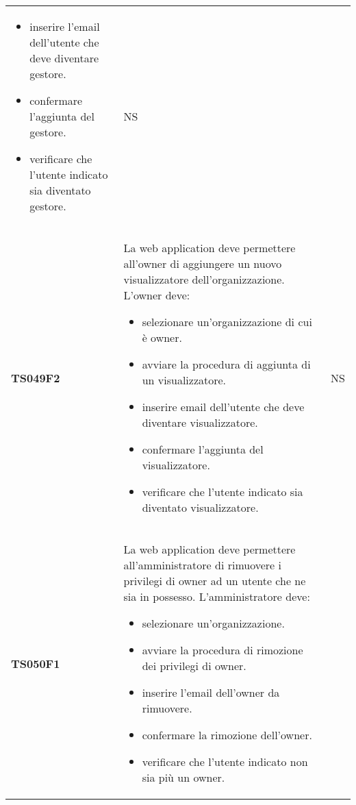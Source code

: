 \documentclass[../piano-di-qualifica.tex]{subfiles}
\begin{document}
\begin{centering}
\begin{longtable}[H]{>{\centering\bfseries}m{3cm} >{}p{10cm} >{\centering\arraybackslash}m{3cm}}
\begin{itemize}
      \item inserire l'email dell'utente che deve diventare gestore.
      \item confermare l'aggiunta del gestore.
      \item verificare che l'utente indicato sia diventato gestore.
    \end{itemize}
                       & NS                                                                                                                                                                                                                                                               \\
    TS049F2            & La web application deve permettere all'owner di aggiungere un nuovo visualizzatore dell'organizzazione. \newline
    L'owner deve:
    \begin{itemize}
      \item selezionare un'organizzazione di cui è owner.
      \item avviare la procedura di aggiunta di un visualizzatore.
      \item inserire email dell'utente che deve diventare visualizzatore.
      \item confermare l'aggiunta del visualizzatore.
      \item verificare che l'utente indicato sia diventato visualizzatore.
    \end{itemize}
                       & NS                                                                                                                                                                                                                                                               \\
    TS050F1            & La web application deve permettere all'amministratore di rimuovere i privilegi di owner ad un utente che ne sia in possesso. \newline
    L'amministratore deve:
    \begin{itemize}
      \item selezionare un'organizzazione.
      \item avviare la procedura di rimozione dei privilegi di owner.
      \item inserire l'email dell'owner da rimuovere.
      \item confermare la rimozione dell'owner.
      \item verificare che l'utente indicato non sia più un owner.

\end{itemize}
\end{longtable}
\end{centering}
\end{document}
